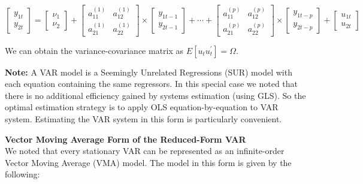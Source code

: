 \documentclass[11pt]{article}
\begin{document}
\vspace{3mm}
\begin{equation*}
\left[ \begin{array}{c} y_{1t} \\ y_{2t} \end{array} \right] = \left[\begin{array}{c} \nu_{1} \\ \nu_{2} \end{array}\right]
+ \begin{bmatrix} a_{11}^{(1)} & a_{12}^{(1)} \\ a_{21}^{(1)} & a_{22}^{(1)} \end{bmatrix} \times 
\left[\begin{array}{c} y_{1t-1} \\ y_{2t-1} \end{array} \right] + 
\cdots + 
\begin{bmatrix} a_{11}^{(p)} & a_{12}^{(p)} \\ a_{21}^{(p)} & a_{22}^{(p)} \end{bmatrix} \times
\left[\begin{array}{c} y_{1t-p} \\ y_{2t-p} \end{array} \right] +  
\left[\begin{array}{c} u_{1t} \\ u_{2t} \end{array} \right]
\end{equation*}

\vspace{3mm}
We can obtain the variance-covariance matrix as $E[u_{t}u_{t}^{\prime}] = \Omega$.

\vspace{3mm}
\textbf{Note:} A VAR model is a Seemingly Unrelated Regressions (SUR) model with each equation containing the same regressors. 
In this special case we noted that there is no additional efficiency gained by systems estimation (using GLS).  So the optimal
estimation strategy is to apply OLS equation-by-equation to VAR system. Estimating the VAR system in this form is particularly 
convenient.

\vspace{10mm}
\textbf{Vector Moving Average Form of the Reduced-Form VAR} \\

\vspace{3.5mm}
We noted that every stationary VAR can be represented as an infinite-order Vector Moving Average (VMA) model.  The model in this
form is given by the following:
\end{document}
